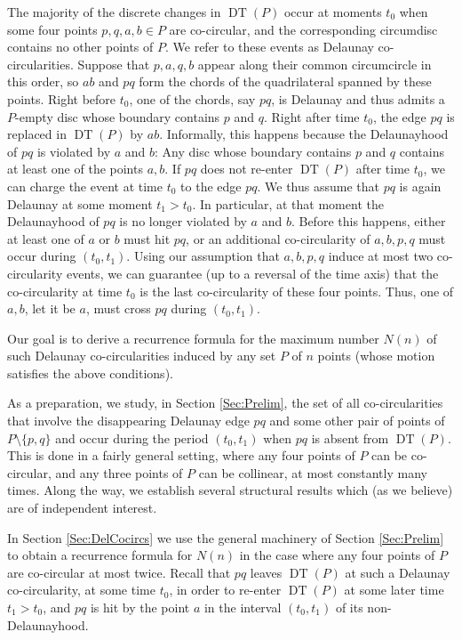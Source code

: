 \documentclass[letter,11pt]{article}
\def\DT{\mathop{\mathrm{DT}}}
\begin{document}
\smallskip
{}
The majority of the discrete changes in $\DT(P)$ occur at moments $t_0$ when some four points $p,q,a,b\in P$ are co-circular, and the corresponding circumdisc contains no other points of $P$. We refer to these events as Delaunay co-circularities. Suppose that $p,a,q,b$ appear along their common circumcircle in this order, so $ab$ and $pq$ form the chords of the quadrilateral spanned by these points. Right before $t_0$, one of the chords, say $pq$, is Delaunay and thus admits a $P$-empty disc whose boundary contains $p$ and $q$. 
Right after time $t_0$, the edge $pq$ is replaced in $\DT(P)$ by $ab$.  
Informally, this happens because the Delaunayhood of $pq$ is violated by $a$ and $b$: Any disc whose boundary contains $p$ and $q$ contains at least one of the points $a,b$. 
If $pq$ does not re-enter $\DT(P)$ after time $t_0$, we can charge the event at time $t_0$ to the edge $pq$. We thus assume that $pq$ is again Delaunay at some moment $t_1>t_0$. In particular, at that moment the Delaunayhood of $pq$ is no longer violated by $a$ and $b$. Before this happens, either at least one of $a$ or $b$ must hit $pq$, or an additional co-circularity of $a,b,p,q$ must occur during $(t_0,t_1)$. Using our assumption that $a,b,p,q$ induce at most two co-circularity events, we can guarantee (up to a reversal of the time axis) that the co-circularity at time $t_0$ is the last co-circularity of these four points. Thus, one of $a,b$, let it be $a$, must cross $pq$ during $(t_0,t_1)$.

Our goal is to derive a recurrence formula for the maximum number $N(n)$ of such Delaunay co-circularities induced by any set $P$ of $n$ points (whose motion satisfies the above conditions). 

As a preparation, we study, in Section \ref{Sec:Prelim}, the set of all co-circularities that involve the disappearing Delaunay edge $pq$ and some other pair of points of $P\setminus \{p,q\}$ and occur during the period $(t_0,t_1)$ when $pq$ is absent from $\DT(P)$.
This is done in a fairly general setting, where any four points of $P$ can be co-circular, and any three points 
of $P$ can be collinear, at most constantly many times. 
Along the way, we establish several structural results which (as we believe) are of independent interest.

In Section \ref{Sec:DelCocircs} we use the general machinery of Section \ref{Sec:Prelim} to obtain a recurrence formula for $N(n)$ in the case where any four points of $P$ are co-circular at most twice.
Recall that $pq$ leaves $\DT(P)$ at such a Delaunay co-circularity, at some time $t_0$, in order to re-enter $\DT(P)$ at some later time $t_1>t_0$, and $pq$ is hit by the point $a$ in the interval $(t_0,t_1)$ of its non-Delaunayhood.
\end{document}
